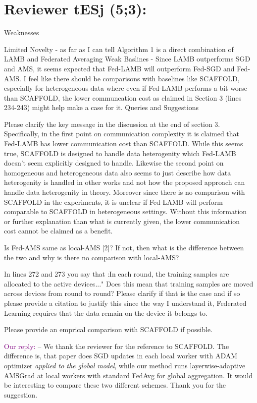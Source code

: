 \documentclass{article}
\begin{document}
\section{Reviewer tESj (5;3):}

Weaknesses

Limited Novelty - as far as I can tell Algorithm 1 is a direct combination of LAMB and Federated Averaging
Weak Baslines - Since LAMB outperforms SGD and AMS, it seems expected that Fed-LAMB will outperform Fed-SGD and Fed-AMS. I feel like there should be comparisons with baselines like SCAFFOLD, especially for heterogeneous data where even if Fed-LAMB performs a bit worse than SCAFFOLD, the lower communcation cost as claimed in Section 3 (lines 234-243) might help make a case for it.
Queries and Suggestions

Please clarify the key message in the discussion at the end of section 3. Specifically, in the first point on communication complexity it is claimed that Fed-LAMB has lower communication cost than SCAFFOLD. While this seems true, SCAFFOLD is designed to handle data heterogenity which Fed-LAMB doesn't seem explicitly designed to handle. Likewise the second point on homogeneous and heterogeneous data also seems to just describe how data heterogenity is handled in other works and not how the proposed approach can handle data heterogenity in theory. Moreover since there is no comparison with SCAFFOLD in the experiments, it is unclear if Fed-LAMB will perform comparable to SCAFFOLD in heterogeneous settings. Without this information or further explanation than what is currently given, the lower communication cost cannot be claimed as a benefit.

Is Fed-AMS same as local-AMS [2]? If not, then what is the difference between the two and why is there no comparison with local-AMS?

In lines 272 and 273 you say that :In each round, the training samples are allocated to the active devices..." Does this mean that training samples are moved across devices from round to round? Please clarify if that is the case and if so please provide a citation to justify this since the way I understand it, Federated Learning requires that the data remain on the device it belongs to.

Please provide an emprical comparison with SCAFFOLD if possible.


\textcolor{purple}{Our reply:}
-- We thank the reviewer for the reference to SCAFFOLD.
The difference is, that paper does SGD updates in each local worker with ADAM optimizer \emph{applied to the global model}, while our method runs layerwise-adaptive AMSGrad at local workers with standard FedAvg for global aggregation.
It would be interesting to compare these two different schemes. 
Thank you for the suggestion.
\end{document}
